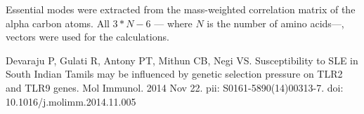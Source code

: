 \documentclass[10pt,letterpaper]{article}
\begin{document}
Essential modes were extracted from the mass-weighted correlation matrix of the alpha carbon atoms. All \( {3*N-6} \) --- where \(N\) is the number of amino acids---, vectors were used for the calculations. 

%
%
% 
\newpage
\nolinenumbers
\begin{thebibliography}{10}

Devaraju P, Gulati R, Antony PT, Mithun CB, Negi VS. Susceptibility to SLE in South Indian Tamils may be influenced by genetic selection pressure on TLR2 and TLR9 genes. Mol Immunol. 2014 Nov 22. pii: S0161-5890(14)00313-7. doi: 10.1016/j.molimm.2014.11.005

\end{thebibliography}
\end{document}
